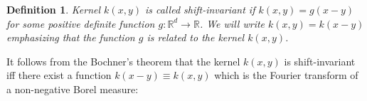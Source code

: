 \documentclass{article}
\theoremstyle{bfnote}
\newtheorem{defi}{Definition}
\begin{document}
	\begin{defi}
		Kernel $k(x, y)$ is called \textit{shift-invariant} if $k(x, y)=g(x-y)$ for some positive definite function $g:\mathbb{R}^d \rightarrow \mathbb{R}$. 
		We will write $k(x, y)=k(x-y)$ emphasizing that the function $g$ is related to the kernel $k(x,y)$.
	\end{defi}

	It follows from the Bochner's theorem that the kernel $k(x, y)$ is shift-invariant iff there exist a function $k(x-y)\equiv k(x, y)$ which is the Fourier transform of a non-negative Borel measure:
	
	

	


	
	
	\begin{lstlisting} 
		
	\end{lstlisting} 
	
		
\end{document}
